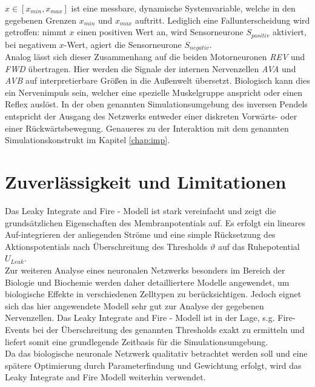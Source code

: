 	$x\in[x_{min}, x_{max}]$ ist eine messbare, dynamische Systemvariable, welche in den gegebenen Grenzen $x_{min} $ und $x_{max}$ auftritt. Lediglich eine Fallunterscheidung wird getroffen: nimmt $x$ einen positiven Wert an, wird Sensorneurone $S_{positiv}$ aktiviert, bei negativem $x$-Wert, agiert die Sensorneurone $S_{negativ}$.\\
	Analog lässt sich dieser Zusammenhang auf die beiden Motorneuronen \textit{REV} und \textit{FWD} übertragen. Hier werden die Signale der internen Nervenzellen \textit{AVA} und \textit{AVB} auf interpretierbare Größen in die Außenwelt übersetzt. Biologisch kann dies ein Nervenimpuls sein, welcher eine spezielle Muskelgruppe anspricht oder einen Reflex auslöst. In der oben genannten Simulationsumgebung des inversen Pendels entspricht der Ausgang des Netzwerks entweder einer diskreten Vorwärts- oder einer Rückwärtsbewegung. Genaueres zu der Interaktion mit dem genannten Simulationskonstrukt im Kapitel \ref{chap:imp}.

\section{Zuverlässigkeit und Limitationen}
\label{sec:lif_lim}
	Das Leaky Integrate and Fire - Modell ist stark vereinfacht und zeigt die grundsätzlichen Eigenschaften des Membranpotentials auf. Es erfolgt ein lineares Auf-integrieren der anliegenden Ströme und eine simple Rücksetzung des Aktionspotentials nach Überschreitung des Thresholds $\vartheta$ auf das Ruhepotential $U_{Leak}$.\\
	Zur weiteren Analyse eines neuronalen Netzwerks besonders im Bereich der Biologie und Biochemie werden daher detailliertere Modelle angewendet, um biologische Effekte in verschiedenen Zelltypen zu berücksichtigen. Jedoch eignet sich das hier angewendete Modell sehr gut zur Analyse der gegebenen Nervenzellen. Das Leaky Integrate and Fire - Modell ist in der Lage, s.g. Fire-Events bei der Überschreitung des genannten Thresholds exakt zu ermitteln und liefert somit eine grundlegende Zeitbasis für die Simulationsumgebung.\\
	Da das biologische neuronale Netzwerk qualitativ betrachtet werden soll und eine spätere Optimierung durch Parameterfindung und Gewichtung erfolgt, wird das Leaky Integrate and Fire Modell weiterhin verwendet.

